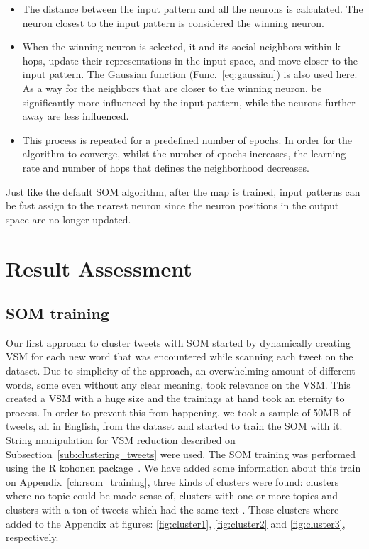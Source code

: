 \documentclass[journal]{IEEEtran}
\begin{document}
\begin{itemize}
  \item The distance between the input pattern and all the neurons is calculated. The neuron closest to the input pattern is considered the winning neuron.
  \item When the winning neuron is selected, it and its social neighbors within k hops, update their representations in the input space, and move closer to the input pattern. The Gaussian function (Func.~\ref{eq:gaussian}) is also used here. As a way for the neighbors that are closer to the winning neuron, be significantly more influenced by the input pattern, while the neurons further away are less influenced. 
  \item This process is repeated for a predefined number of epochs. In order for the algorithm to converge, whilst the number of epochs increases, the learning rate and number of hops that defines the neighborhood decreases.
\end{itemize}

Just like the default \ac{SOM} algorithm, after the map is trained, input patterns can be fast assign to the nearest neuron since the neuron positions in the output space are no longer updated.
 
\section{Result Assessment}
\label{sec:result_assessment}

\subsection{SOM training}
\label{sub:clustering_tweets_with_soms}
Our first approach to cluster tweets with \ac{SOM} started by dynamically creating \ac{VSM} for each new word that was encountered while scanning each tweet on the dataset. Due to simplicity of the approach, an overwhelming amount of different words, some even without any clear meaning, took relevance on the \ac{VSM}. 
This created a \ac{VSM} with a huge size and the trainings at hand took an eternity to process. In order to prevent this from happening, we took a sample of 50MB of tweets, all in English, from the dataset and started to train the \ac{SOM} with it. String manipulation for \ac{VSM} reduction described on Subsection~\ref{sub:clustering_tweets} were used.
The \ac{SOM} training was performed using the R kohonen package~\cite{rsom}. We have added some information about this train on Appendix~\ref{ch:rsom_training}, three kinds of clusters were found: clusters where no topic could be made sense of, clusters with one or more topics and clusters with a ton of tweets which had the same text . These clusters where added to the Appendix at figures: \ref{fig:cluster1}, \ref{fig:cluster2} and \ref{fig:cluster3}, respectively.  
\end{document}
